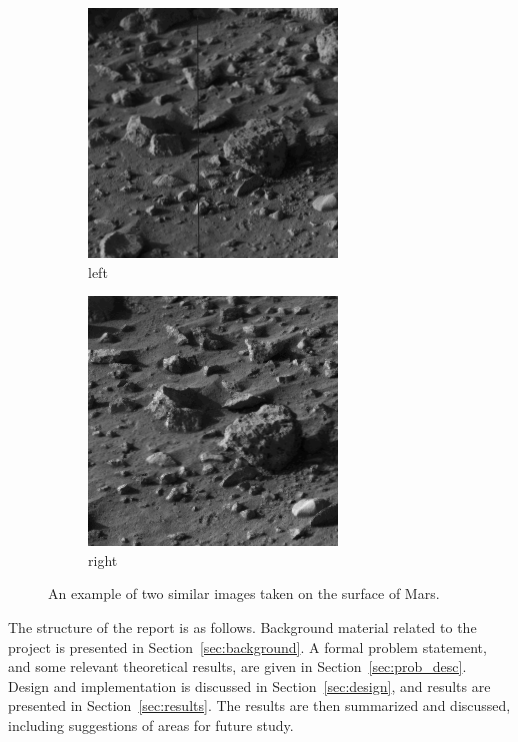 \documentclass[10pt,twoside,titlepage]{article}
\begin{document}
\begin{figure}
    \centering
    \begin{subfigure}{0.5\textwidth}
        \centering
        \includegraphics[width=0.6\linewidth]{mars_left.png}
        \caption{left}
    \end{subfigure}%
    \begin{subfigure}{0.5\textwidth}
        \centering
        \includegraphics[width=0.6\linewidth]{mars_right.png}
        \caption{right}
    \end{subfigure}
    \caption{An example of two similar images taken on the surface of Mars.}
    \label{fig:mars}
\end{figure}

The structure of the report is as follows. Background material related to the project is presented in Section~\ref{sec:background}. A formal problem statement, and some relevant theoretical results, are  given in Section~\ref{sec:prob_desc}. Design and implementation is discussed in Section~\ref{sec:design}, and results are presented in Section~\ref{sec:results}. The results are then summarized and discussed, including suggestions of areas for future study.
\end{document}
